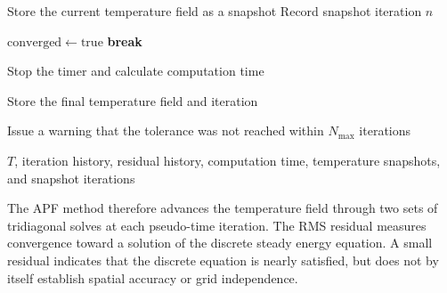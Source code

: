 \begin{algorithm}[H]
\begin{algorithmic}[1]
        \State Store the current temperature field as a snapshot
        \State Record snapshot iteration $n$
    \EndIf

        \State $\mathrm{converged}\gets\mathrm{true}$
        \State \textbf{break}
    \EndIf
\EndFor

\State Stop the timer and calculate computation time

    \State Store the final temperature field and iteration
\EndIf

    \State Issue a warning that the tolerance was not reached
    within $N_{\max}$ iterations
\EndIf

\State \Return $T$, iteration history, residual history,
computation time, temperature snapshots, and snapshot iterations
\end{algorithmic}
\end{algorithm}

The APF method therefore advances the temperature field through
two sets of tridiagonal solves at each pseudo-time iteration.
The RMS residual measures convergence toward a solution of the
discrete steady energy equation. A small residual indicates
that the discrete equation is nearly satisfied, but does not
by itself establish spatial accuracy or grid independence.